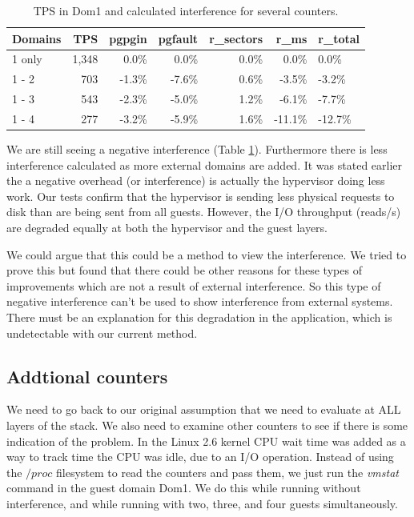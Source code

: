 \begin{table}[h]
\begin{tabular}{ l r r r r r p{5cm} }
    Domains &  TPS & pgpgin &   pgfault & r\_sectors & r\_ms & r\_total \\
    \hline
    1 only & 1,348 & 0.0\%  &    0.0\%  &  0.0\%     &  0.0\% &   0.0\%  \\
    1 - 2  &  703  & -1.3\% &	-7.6\%  &  0.6\%     &  -3.5\% &  -3.2\%  \\
    1 - 3  &  543  & -2.3\% & 	-5.0\%  &  1.2\%     &  -6.1\% &  -7.7\%  \\
    1 - 4  &  277  & -3.2\% &   -5.9\%  &  1.6\%     & -11.1\% &  -12.7\% \\
    \hline
\end{tabular}
\caption{TPS in Dom1 and calculated interference for several counters.}
\label{fig:InterferenceMed}
\end{table}

We are still seeing a negative interference (Table \ref{fig:InterferenceMed}).  Furthermore there is less interference calculated as more external domains are added.  
It was stated earlier the a negative overhead (or interference) is actually the hypervisor doing less work.  
Our tests confirm that the hypervisor is sending less physical requests to disk than are being sent from all guests.  
However, the I/O throughput (reads/s) are degraded equally at both the hypervisor and the guest layers.  

We could argue that this could be a method to view the interference.  
We tried to prove this but found that there could be other reasons for these types of improvements which are not a result of external interference.  
So this type of negative interference can't be used to show interference from external systems. 
There must be an explanation for this degradation in the application, which is undetectable with our current method.

\subsection{Addtional counters}
We need to go back to our original assumption that we need to evaluate at ALL layers of the stack.  We also need to examine other counters to see if there is some indication of the problem.  In the Linux 2.6 kernel CPU wait time was added as a way to track time the CPU was idle, due to an I/O operation.  Instead of using the $/proc$ filesystem to read the counters and pass them, we just run the \emph{vmstat} command in the guest domain Dom1.  We do this while running without interference, and while running with two, three, and four guests simultaneously.

